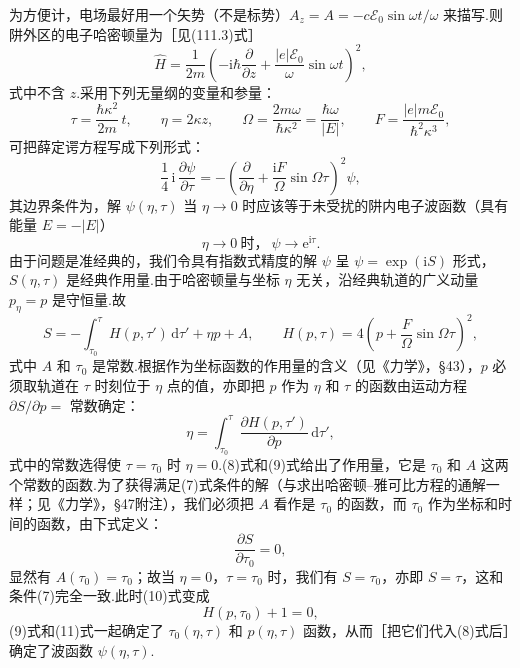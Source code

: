\begin{xiti}
为方便计，电场最好用一个矢势（不是标势）$A_z=A=-c\mathcal{E}_0\sin\omega t/\omega$ 来描写.则阱外区的电子哈密顿量为［见(111.3)式］
\begin{equation*}
  \hat{H}=\frac{1}{2m}\left(-\mathrm{i}\hbar\frac{\partial}{\partial z}
  +\frac{|e|\mathcal{E}_0}{\omega}\sin\omega t\right)^{2},
\end{equation*}
式中不含 $z$.采用下列无量纲的变量和参量：
\begin{equation*}
  \tau=\frac{\hbar\kappa^{2}}{2m}\,t,
  \qquad
  \eta=2\kappa z,
  \qquad
  \Omega=\frac{2m\omega}{\hbar\kappa^{2}}=\frac{\hbar\omega}{|E|},
  \qquad
  F=\frac{|e|m\mathcal{E}_0}{\hbar^{2}\kappa^{3}},
\end{equation*}
可把薛定谔方程写成下列形式：
\begin{equation*}
  \frac{1}{4}\,\mathrm{i}\,\frac{\partial\psi}{\partial\tau}
  =-\left(\frac{\partial}{\partial\eta}
  +\frac{\mathrm{i}F}{\Omega}\sin\Omega\tau\right)^{2}\psi,
\end{equation*}
其边界条件为，解 $\psi(\eta,\tau)$ 当 $\eta\rightarrow0$ 时应该等于未受扰的阱内电子波函数（具有能量 $E=-|E|$）
\begin{equation}
  \eta\rightarrow0\ \text{时，}\ \psi\rightarrow\mathrm{e}^{\mathrm{i}\tau}.
\end{equation}
由于问题是准经典的，我们令具有指数式精度的解 $\psi$ 呈 $\psi=\exp(\mathrm{i}S)$ 形式，$S(\eta,\tau)$ 是经典作用量.由于哈密顿量与坐标 $\eta$ 无关，沿经典轨道的广义动量 $p_\eta=p$ 是守恒量.故
\begin{equation}
  S=-\int_{\tau_0}^{\tau}H(p,\tau')\,\mathrm{d}\tau'+\eta p+A,
  \qquad
  H(p,\tau)=4\left(p+\frac{F}{\Omega}\sin\Omega\tau\right)^{2},
\end{equation}
式中 $A$ 和 $\tau_0$ 是常数.根据作为坐标函数的作用量的含义（见《力学》，§43），$p$ 必须取轨道在 $\tau$ 时刻位于 $\eta$ 点的值，亦即把 $p$ 作为 $\eta$ 和 $\tau$ 的函数由运动方程 $\partial S/\partial p=$ 常数确定：
\begin{equation}
  \eta=\int_{\tau_0}^{\tau}\frac{\partial H(p,\tau')}{\partial p}\,\mathrm{d}\tau',
\end{equation}
式中的常数选得使 $\tau=\tau_0$ 时 $\eta=0$.(8)式和(9)式给出了作用量，它是 $\tau_0$ 和 $A$ 这两个常数的函数.为了获得满足(7)式条件的解（与求出哈密顿–雅可比方程的通解一样；见《力学》，§47附注），我们必须把 $A$ 看作是 $\tau_0$ 的函数，而 $\tau_0$ 作为坐标和时间的函数，由下式定义：
\begin{equation}
  \frac{\partial S}{\partial\tau_0}=0,
\end{equation}
显然有 $A(\tau_0)=\tau_0$；故当 $\eta=0$，$\tau=\tau_0$ 时，我们有 $S=\tau_0$，亦即 $S=\tau$，这和条件(7)完全一致.此时(10)式变成
\begin{equation}
  H(p,\tau_0)+1=0,
\end{equation}
(9)式和(11)式一起确定了 $\tau_0(\eta,\tau)$ 和 $p(\eta,\tau)$ 函数，从而［把它们代入(8)式后］确定了波函数 $\psi(\eta,\tau)$.


\end{xiti}
